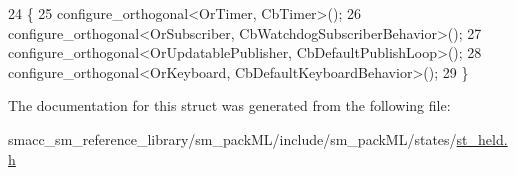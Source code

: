 \begin{DoxyCode}
24     \{
25         configure\_orthogonal<OrTimer, CbTimer>();   
26         configure\_orthogonal<OrSubscriber, CbWatchdogSubscriberBehavior>();
27         configure\_orthogonal<OrUpdatablePublisher, CbDefaultPublishLoop>();
28         configure\_orthogonal<OrKeyboard, CbDefaultKeyboardBehavior>();
29     \}
\end{DoxyCode}


The documentation for this struct was generated from the following file\+:\begin{DoxyCompactItemize}
\item 
smacc\+\_\+sm\+\_\+reference\+\_\+library/sm\+\_\+pack\+M\+L/include/sm\+\_\+pack\+M\+L/states/\hyperlink{st__held_8h}{st\+\_\+held.\+h}\end{DoxyCompactItemize}
